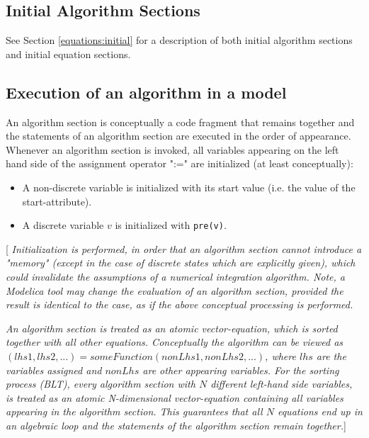 \documentclass[11pt,a4paper,notitlepage]{report}
\begin{document}
\subsection{Initial Algorithm Sections}

See Section \ref{equations:initial} for a description of both initial algorithm sections and initial equation sections.

\subsection{Execution of an algorithm in a model}

An algorithm section is conceptually a code fragment that remains together and the statements of an algorithm
section are executed in the order of appearance. Whenever an algorithm section is invoked, all variables appearing
on the left hand side of the assignment operator ":=" are initialized (at least conceptually):
\begin{itemize}
\item A non-discrete variable is initialized with its start value (i.e. the value of the start-attribute).
\item A discrete variable $v$ is initialized with \verb"pre(v)". 
\end{itemize}

[\emph{
Initialization is performed, in order that an algorithm section cannot introduce a "memory" (except in the case of
discrete states which are explicitly given), which could invalidate the assumptions of a numerical integration
algorithm. Note, a Modelica tool may change the evaluation of an algorithm section, provided the result is
identical to the case, as if the above conceptual processing is performed.}

\emph{An algorithm section is treated as an atomic vector-equation, which is sorted together with all other equations.
Conceptually the algorithm can be viewed as $(lhs1, lhs2, ...) = someFunction(nonLhs1, nonLhs2, ...)$, where $lhs$
are the variables assigned and $nonLhs$ are other appearing variables. For the sorting process (BLT), every
algorithm section with $N$ different left-hand side variables, is treated as an atomic N-dimensional vector-equation
containing all variables appearing in the algorithm section. This guarantees that all $N$ equations end up in an
algebraic loop and the statements of the algorithm section remain together.}]

\end{document}
